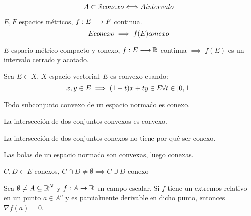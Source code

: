 \begin{prop}
    $$A\subset \mathbb R \\ conexo \\\Longleftrightarrow\\ A \\ intervalo$$
\end{prop}

\begin{teo}
    $E,F$ espacios métricos, $f:E \longrightarrow F$ continua.
    $$E \\ conexo \implies f(E) \\ conexo$$
\end{teo}

\begin{coro}
    $E$ espacio métrico compacto y conexo, $f:E\longrightarrow\mathbb R$ continua $\implies$ $f(E)$ es un intervalo cerrado y acotado.
\end{coro}

\begin{definicion}
    Sea $E\subset X$, $X$ espacio vectorial. $E$ es convexo cuando: 
    $$x,y \in E \implies (1-t)x+ty \in E \\ \forall t \in [0,1]$$
\end{definicion}

\begin{prop}
    Todo subconjunto convexo de un espacio normado es conexo.
\end{prop}

\begin{prop}
    La intersección de dos conjuntos convexos es convexo.
\end{prop}

\begin{observacion}
    La intersección de dos conjuntos conexos no tiene por qué ser conexo.
\end{observacion}

\begin{prop}
    Las bolas de un espacio normado son convexas, luego conexas.
\end{prop}

\begin{prop}
    $C,D \subset E$ conexos, $C\cap D \neq \emptyset \implies C\cup D$ conexo
\end{prop}

\begin{prop}
    Sea $\emptyset \neq A \subseteq \mathbb R^N$ y $f:A \rightarrow \mathbb R$ un campo escalar. Si $f$ tiene un extremos relativo en un punto $a \in A^o$ y es parcialmente derivable en dicho punto, entonces $\nabla f(a)=0$.
\end{prop}

